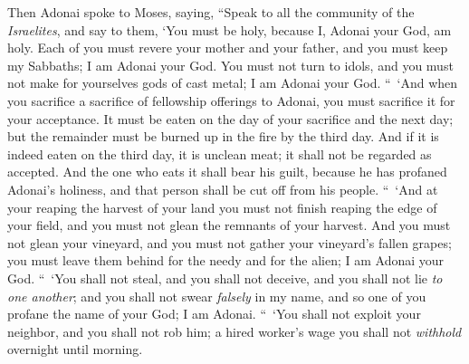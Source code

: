 \begin{biblechapter} %
 Then Adonai spoke to Moses, saying,
\verse “Speak to all the community of the \textit{Israelites}, and say to them, ‘You must be holy, because I, Adonai your God, am holy.
\verse Each of you must revere your mother and your father, and you must keep my Sabbaths; I am Adonai your God.
\verse You must not turn to idols, and you must not make for yourselves gods of cast metal; I am Adonai your God.
\verse “ ‘And when you sacrifice a sacrifice of fellowship offerings to Adonai, you must sacrifice it for your acceptance.
\verse It must be eaten on the day of your sacrifice and the next day; but the remainder must be burned up in the fire by the third day.
\verse And if it is indeed eaten on the third day, it is unclean meat; it shall not be regarded as accepted.
\verse And the one who eats it shall bear his guilt, because he has profaned Adonai’s holiness, and that person shall be cut off from his people.
 “ ‘And at your reaping the harvest of your land you must not finish reaping the edge of your field, and you must not glean the remnants of your harvest.
\verse And you must not glean your vineyard, and you must not gather your vineyard’s fallen grapes; you must leave them behind for the needy and for the alien; I am Adonai your God.
\verse “ ‘You shall not steal, and you shall not deceive, and you shall not lie \textit{to one another};
\verse and you shall not swear \textit{falsely} in my name, and so one of you profane the name of your God; I am Adonai.
\verse “ ‘You shall not exploit your neighbor, and you shall not rob him; a hired worker’s wage you shall not \textit{withhold} overnight until morning.

\end{biblechapter}

